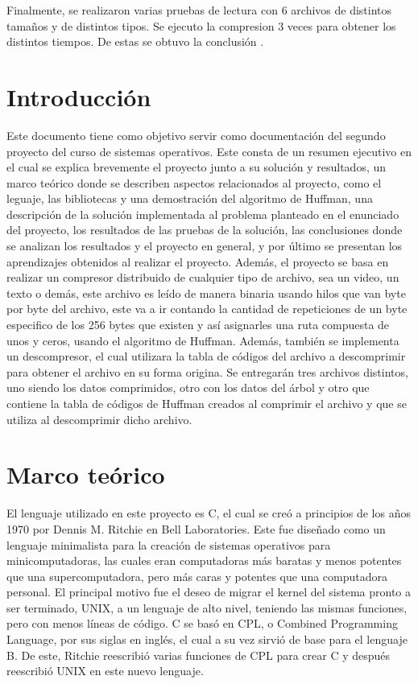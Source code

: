 \documentclass[12pt, article, natbib]{IEEEtran}
\begin{document}
Finalmente, se realizaron varias pruebas de lectura con 6 archivos de distintos tamaños y de distintos tipos. Se ejecuto la compresion 3 veces para obtener los distintos tiempos. De estas se obtuvo la conclusión .

\newpage
\twocolumn
\section{Introducción}
Este documento tiene como objetivo servir como documentación del segundo proyecto del curso de sistemas operativos. Este consta de un resumen ejecutivo en el cual se explica brevemente el proyecto junto a su solución y resultados, un marco teórico donde se describen aspectos relacionados al proyecto, como el leguaje, las bibliotecas y una demostración del algoritmo de Huffman, una descripción de la solución implementada al problema planteado en el enunciado del proyecto, los resultados de las pruebas de la solución, las conclusiones donde se analizan los resultados y el proyecto en general, y por último se presentan los aprendizajes obtenidos al realizar el proyecto. Además, el proyecto se basa en realizar un compresor distribuido de cualquier tipo de archivo, sea un video, un texto o demás, este archivo es leído de manera binaria usando hilos que van byte por byte del archivo, este va a ir contando la cantidad de repeticiones de un byte especifico de los 256 bytes que existen y así asignarles una ruta compuesta de unos y ceros, usando el algoritmo de Huffman. Además, también se implementa un descompresor, el cual utilizara la tabla de códigos del archivo a descomprimir para obtener el archivo en su forma origina. Se entregarán tres archivos distintos, uno siendo los datos comprimidos, otro con los datos del árbol y otro que contiene la tabla de códigos de Huffman creados al comprimir el archivo y que se utiliza al descomprimir dicho archivo.

\section{Marco teórico}
El lenguaje utilizado en este proyecto es C, el cual se creó a principios de los años 1970 por Dennis M. Ritchie en Bell Laboratories. Este fue diseñado como un lenguaje minimalista para la creación de sistemas operativos para minicomputadoras, las cuales eran computadoras más baratas y menos potentes que una supercomputadora, pero más caras y potentes que una computadora personal. El principal motivo fue el deseo de migrar el kernel del sistema pronto a ser terminado, UNIX, a un lenguaje de alto nivel, teniendo las mismas funciones, pero con menos líneas de código. C se basó en CPL, o Combined Programming Language, por sus siglas en inglés, el cual a su vez sirvió de base para el lenguaje B. De este, Ritchie reescribió varias funciones de CPL para crear C y después reescribió UNIX en este nuevo lenguaje.\cite{encyclopdiabritannica_2022_c} \cite{munoz_after}\\
\end{document}
